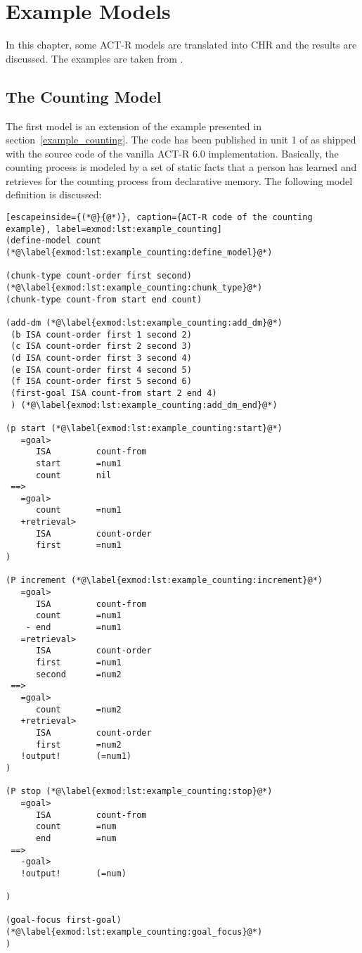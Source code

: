 \chapter{Example Models}

In this chapter, some ACT-R models are translated into CHR and the results are discussed. The examples are taken from  \cite{actr_tutorial}.

\section{The Counting Model}

The first model is an extension of the example presented in section~\ref{example_counting}. The code has been published in unit 1 of  \cite{actr_tutorial} as shipped with the source code of the vanilla ACT-R 6.0 implementation. Basically, the counting process is modeled by a set of static facts that a person has learned and retrieves for the counting process from declarative memory. The following model definition is discussed:

\begin{lstlisting}[escapeinside={(*@}{@*)}, caption={ACT-R code of the counting example}, label=exmod:lst:example_counting]
(define-model count (*@\label{exmod:lst:example_counting:define_model}@*)

(chunk-type count-order first second) (*@\label{exmod:lst:example_counting:chunk_type}@*)
(chunk-type count-from start end count)

(add-dm (*@\label{exmod:lst:example_counting:add_dm}@*)
 (b ISA count-order first 1 second 2)
 (c ISA count-order first 2 second 3)
 (d ISA count-order first 3 second 4)
 (e ISA count-order first 4 second 5)
 (f ISA count-order first 5 second 6)
 (first-goal ISA count-from start 2 end 4)
 ) (*@\label{exmod:lst:example_counting:add_dm_end}@*)

(p start (*@\label{exmod:lst:example_counting:start}@*)
   =goal>
      ISA         count-from
      start       =num1
      count       nil
 ==>
   =goal>
      count       =num1
   +retrieval>
      ISA         count-order
      first       =num1
)

(P increment (*@\label{exmod:lst:example_counting:increment}@*)
   =goal>
      ISA         count-from
      count       =num1
    - end         =num1
   =retrieval>
      ISA         count-order
      first       =num1
      second      =num2
 ==>
   =goal>
      count       =num2
   +retrieval>
      ISA         count-order
      first       =num2
   !output!       (=num1)
)

(P stop (*@\label{exmod:lst:example_counting:stop}@*)
   =goal>
      ISA         count-from
      count       =num
      end         =num
 ==>
   -goal>
   !output!       (=num)

)

(goal-focus first-goal) (*@\label{exmod:lst:example_counting:goal_focus}@*)
)
\end{lstlisting}

